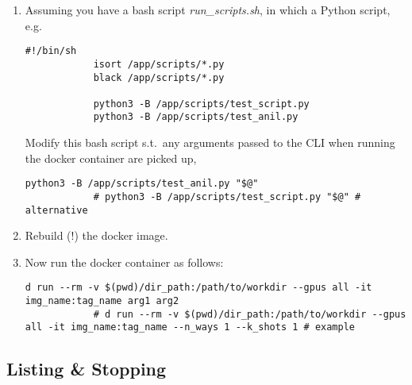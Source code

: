 \documentclass[12pt, a4paper]{scrbook}
\numberwithin{equation}{section}
\theoremstyle{definition}
\theoremstyle{definition}
\begin{document}
	\begin{enumerate}
		\item Assuming you have a bash script \textit{run\_scripts.sh}, in which a Python script, e.g.
		
		\begin{lstlisting}[style=mystylebash, label=alg:docker_run__pass_arguments, xleftmargin=\parindent]
			#!/bin/sh
			isort /app/scripts/*.py
			black /app/scripts/*.py
			
			python3 -B /app/scripts/test_script.py
			python3 -B /app/scripts/test_anil.py
		\end{lstlisting}
		
		Modify this bash script s.t.~any arguments passed to the CLI when running the docker container are picked up,
		
		\begin{lstlisting}[style=mystylebash, label=alg:docker_run__pass_arguments_mod, xleftmargin=\parindent]
			python3 -B /app/scripts/test_anil.py "$@"
			# python3 -B /app/scripts/test_script.py "$@" # alternative
		\end{lstlisting}
		
		\item Rebuild (!) the docker image.
		
		\item Now run the docker container as follows:
		
		\begin{lstlisting}[style=mystylebash, label=alg:docker_run__pass_arguments_container, xleftmargin=\parindent]
			d run --rm -v $(pwd)/dir_path:/path/to/workdir --gpus all -it img_name:tag_name arg1 arg2
			# d run --rm -v $(pwd)/dir_path:/path/to/workdir --gpus all -it img_name:tag_name --n_ways 1 --k_shots 1 # example
		\end{lstlisting}
		
	\end{enumerate}
	
	\subsection{Listing \& Stopping}
	
\end{document}

